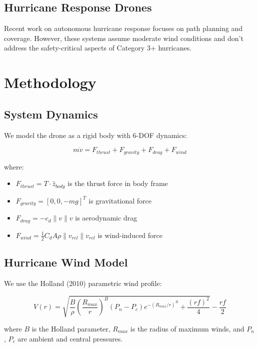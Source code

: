 \documentclass[10pt,twocolumn]{article}
\begin{document}
\subsection{Hurricane Response Drones}

Recent work on autonomous hurricane response \cite{rivera2023autonomous} focuses on path planning and coverage. However, these systems assume moderate wind conditions and don't address the safety-critical aspects of Category 3+ hurricanes.

\section{Methodology}

\subsection{System Dynamics}

We model the drone as a rigid body with 6-DOF dynamics:

\begin{equation}
    m\dot{v} = F_{thrust} + F_{gravity} + F_{drag} + F_{wind}
\end{equation}

where:
\begin{itemize}
    \item $F_{thrust} = T \cdot \hat{z}_{body}$ is the thrust force in body frame
    \item $F_{gravity} = [0, 0, -mg]^T$ is gravitational force
    \item $F_{drag} = -c_d \|v\| v$ is aerodynamic drag
    \item $F_{wind} = \frac{1}{2} C_d A \rho \|v_{rel}\| v_{rel}$ is wind-induced force
\end{itemize}

\subsection{Hurricane Wind Model}

We use the Holland (2010) parametric wind profile:

\begin{equation}
    V(r) = \sqrt{\frac{B}{\rho} \left(\frac{R_{max}}{r}\right)^B (P_n - P_c) e^{-(R_{max}/r)^B} + \frac{(rf)^2}{4}} - \frac{rf}{2}
\end{equation}

where $B$ is the Holland parameter, $R_{max}$ is the radius of maximum winds, and $P_n$, $P_c$ are ambient and central pressures.
\end{document}
